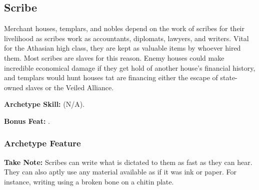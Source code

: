 \subsection{Scribe}
Merchant houses, templars, and nobles depend on the work of scribes for their livelihood as scribes work as accountants, diplomats, lawyers, and writers. Vital for the Athasian high class, they are kept as valuable items by whoever hired them. Most scribes are slaves for this reason. Enemy houses could make incredible economical damage if they get hold of another house's financial history, and templars would hunt houses tat are financing either the escape of state-owned slaves or the Veiled Alliance.

\textbf{Archetype Skill:}  (N/A).

\textbf{Bonus Feat:} .

\subsubsection{Archetype Feature}
\textbf{Take Note:} Scribes can write what is dictated to them as fast as they can hear. They can also aptly use any material available as if it was ink or paper. For instance, writing using a broken bone on a chitin plate.
